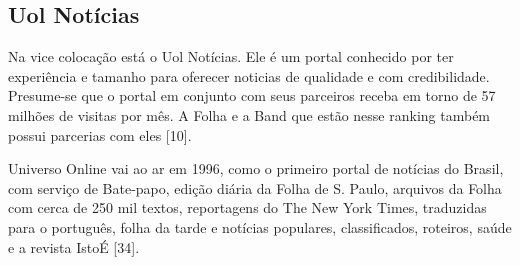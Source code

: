 \documentclass[a4paper]{article}
\begin{document}
\begin{titlepage}
\subsection{Uol Notícias}

Na vice colocação está o Uol Notícias. Ele é um portal conhecido por ter experiência e tamanho para oferecer noticias de qualidade e com credibilidade. Presume-se que o portal em conjunto com seus parceiros receba em torno de 57 milhões de visitas por mês. A Folha e a Band que estão nesse ranking também possui parcerias com eles [10].

Universo Online vai ao ar em 1996, como o primeiro portal de notícias do Brasil, com serviço de Bate-papo, edição diária da Folha de S. Paulo, arquivos da Folha com cerca de 250 mil textos, reportagens do The New York Times, traduzidas para o português, folha da tarde e notícias populares, classificados, roteiros, saúde e a revista IstoÉ [34].


\end{titlepage}
\end{document}
